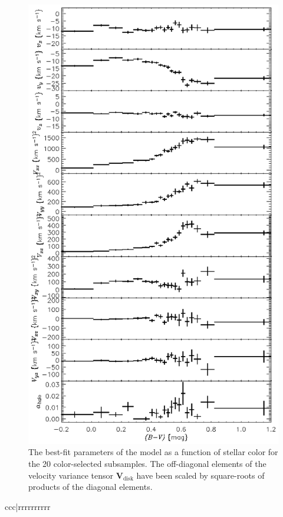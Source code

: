 \documentclass[12pt,preprint]{aastex}
\newcommand{\ten}[1]{\mathbf{#1}} %
\newcommand{\VV}{\ten{V}}
\newcommand{\VVdisk}{\VV_\mathrm{\!disk}}
\begin{document}
\clearpage
\begin{figure}
\includegraphics{lsr_1_parameters.ps}
\caption{The best-fit parameters of the model as a function of stellar
color for the 20 color-selected subsamples.  The off-diagonal elements
of the velocity variance tensor $\VVdisk$ have been scaled by
square-roots of products of the diagonal
elements.\label{fig:lsr_1_parameters}}
\end{figure}

\clearpage
\begin{deluxetable}{ccc|rrrrrrrrrr}
\rotate
{}
\tablewidth{0pc}
\startdata

\enddata
\end{deluxetable}
\end{document}

